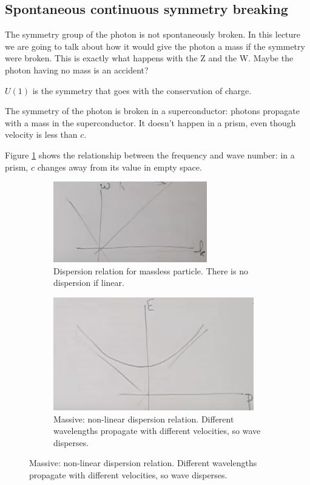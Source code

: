 \documentclass[]{article}
\begin{document}
\subsection{Spontaneous continuous symmetry breaking}
The symmetry group of the photon is not spontaneously broken. In this lecture we are going to talk about how it would give the photon a mass if the symmetry were broken. This is exactly what happens with the Z and the W. Maybe the photon having no mass is an accident?

$U(1)$ is the symmetry that goes with the conservation of charge.

The symmetry of the photon is broken in a superconductor: photons propagate with a mass in the superconductor. It doesn't happen in a prism, even though velocity is less than $c$.

Figure \ref{fig:2-8-massless} shows the relationship between the frequency and wave number: in a prism, $c$ changes away from its value in empty space. 

\begin{figure}[H]
	\caption{Dispersion relations for Massive and Massless particles}
	\begin{subfigure}[t]{0.45\textwidth}
		\caption{Dispersion relation for massless particle. There is no dispersion if linear.}\label{fig:2-8-massless}
		\includegraphics[width=\textwidth]{2-8-massless}
	\end{subfigure}
	\begin{subfigure}[t]{0.45\textwidth}
		\caption{Massive: non-linear dispersion relation. Different wavelengths propagate with different velocities, so wave disperses.}\label{fig:2-8-massive}
		\includegraphics[width=\textwidth]{2-8-massive}
	\end{subfigure}
\end{figure}
\end{document}
